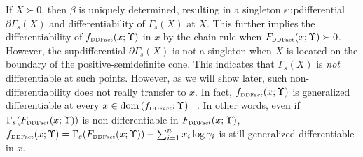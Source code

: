 \documentclass[smallextended]{svjour3hack}       %
\makeatletter
\newcommand{\zc}[1]{\noindent{\color{red}[Zhongzhu:]\ {#1}}}
\newcommand{\mf}[1]{\noindent{\color{green}[Marcia:]\ {#1}}}
\DeclareMathOperator{\Diag}{Diag}
\DeclareMathOperator{\rank}{rank}
\DeclareMathOperator{\dom}{dom}
\renewcommand*{\top}{%
  {\mathpalette\@transpose{}}%
}
\newcommand*{\@transpose}[2]{%
  \raisebox{\depth}{$\m@th#1\mathsf{T}$}%
}
\makeatother
\begin{document}
\begin{remark}
   If $X \succ 0$, then $\beta$ is uniquely determined, resulting in a singleton supdifferential $\partial \Gamma_{s}(X)$ and differentiability of $\Gamma_s(X)$ at $X$.
   This further implies the differentiability of $f_{{\tiny\mbox{DDFact}}}(x;\Upsilon)$ in $x$ by the chain rule when $F_{{\tiny\mbox{DDFact}}}(x;\Upsilon) \succ 0$. However, the supdifferential $\partial \Gamma_{s}(X)$ is not a singleton when $X$ is located on the boundary of the positive-semidefinite cone. This indicates that $\Gamma_{s}(X)$ is \emph{not} differentiable at such points.
   However, as we will show later, such non-differentiability does not really transfer to $x$. In fact, $f_{{\tiny\mbox{DDFact}}}(x;\Upsilon)$ is generalized differentiable at every $x\in \dom\left(f_{{\tiny\mbox{DDFact}}}; \Upsilon\right)_+$\,. In other words, even if $\Gamma_s(F_{{\tiny\mbox{DDFact}}}(x;\Upsilon))$ is non-differentiable in $F_{{\tiny\mbox{DDFact}}}(x;\Upsilon)$, $f_{{\tiny\mbox{DDFact}}}(x;\Upsilon) = \Gamma_s(F_{{\tiny\mbox{DDFact}}}(x;\Upsilon)) -\sum_{i=1}^n x_i \log \gamma_i$  is still generalized differentiable in $x$.
\end{remark}
\end{document}
